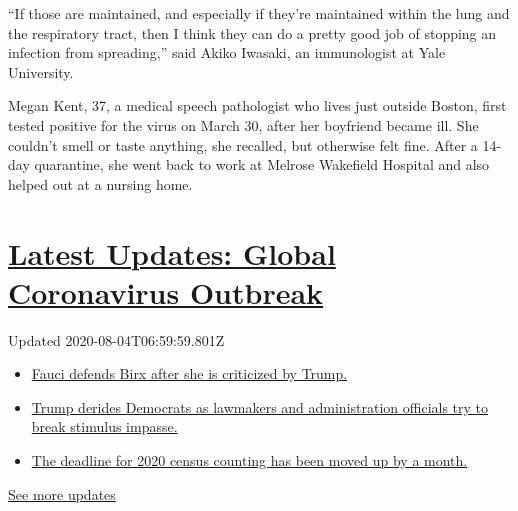 ``If those are maintained, and especially if they're maintained within
the lung and the respiratory tract, then I think they can do a pretty
good job of stopping an infection from spreading,'' said Akiko Iwasaki,
an immunologist at Yale University.

Megan Kent, 37, a medical speech pathologist who lives just outside
Boston, first tested positive for the virus on March 30, after her
boyfriend became ill. She couldn't smell or taste anything, she
recalled, but otherwise felt fine. After a 14-day quarantine, she went
back to work at Melrose Wakefield Hospital and also helped out at a
nursing home.

\hypertarget{latest-updates-global-coronavirus-outbreak}{%
\section{\texorpdfstring{\href{https://www.nytimes.com/2020/08/03/world/coronavirus-covid-19.html?action=click\&pgtype=Article\&state=default\&region=MAIN_CONTENT_1\&context=storylines_live_updates}{Latest
Updates: Global Coronavirus
Outbreak}}{Latest Updates: Global Coronavirus Outbreak}}\label{latest-updates-global-coronavirus-outbreak}}

Updated 2020-08-04T06:59:59.801Z

\begin{itemize}
\tightlist
\item
  \href{https://www.nytimes.com/2020/08/03/world/coronavirus-covid-19.html?action=click\&pgtype=Article\&state=default\&region=MAIN_CONTENT_1\&context=storylines_live_updates\#link-4547638f}{Fauci
  defends Birx after she is criticized by Trump.}
\item
  \href{https://www.nytimes.com/2020/08/03/world/coronavirus-covid-19.html?action=click\&pgtype=Article\&state=default\&region=MAIN_CONTENT_1\&context=storylines_live_updates\#link-15e7f995}{Trump
  derides Democrats as lawmakers and administration officials try to
  break stimulus impasse.}
\item
  \href{https://www.nytimes.com/2020/08/03/world/coronavirus-covid-19.html?action=click\&pgtype=Article\&state=default\&region=MAIN_CONTENT_1\&context=storylines_live_updates\#link-e5a2cda}{The
  deadline for 2020 census counting has been moved up by a month.}
\end{itemize}

\href{https://www.nytimes.com/2020/08/03/world/coronavirus-covid-19.html?action=click\&pgtype=Article\&state=default\&region=MAIN_CONTENT_1\&context=storylines_live_updates}{See
more updates}

